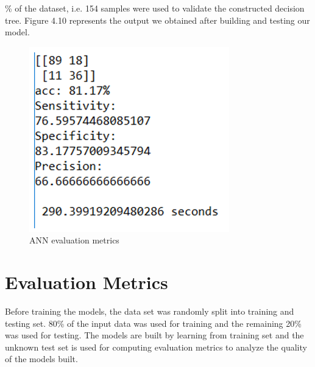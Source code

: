 \par \noindent
{}\% of the dataset, i.e. 154 samples were used to validate the constructed decision tree. Figure 4.10 represents the output we obtained after building and testing our model.
\begin{figure}[h]
\centering
\includegraphics[scale=1.0]{anneval.PNG}
\caption{\label{fig:subBDDs1}ANN evaluation metrics}
\end{figure}
\pagebreak
\newline

\section{Evaluation Metrics}
Before training the models, the data set was randomly split into training and testing set. 80\% of the input data was used for training and the remaining 20\% was used for testing. The models are built by learning from training set and the unknown test set is used for computing evaluation metrics to analyze the quality of the models built.

